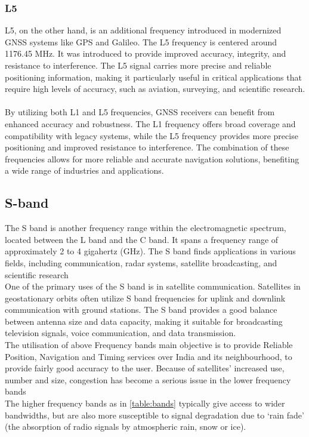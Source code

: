 \subsubsection{L5}
L5, on the other hand, is an additional frequency introduced in modernized GNSS systems like GPS and Galileo. The L5 frequency is centered around 1176.45 MHz. It was introduced to provide improved accuracy, integrity, and resistance to interference. The L5 signal carries more precise and reliable positioning information, making it particularly useful in critical applications that require high levels of accuracy, such as aviation, surveying, and scientific research.
\\
\\
By utilizing both L1 and L5 frequencies, GNSS receivers can benefit from enhanced accuracy and robustness. The L1 frequency offers broad coverage and compatibility with legacy systems, while the L5 frequency provides more precise positioning and improved resistance to interference. The combination of these frequencies allows for more reliable and accurate navigation solutions, benefiting a wide range of industries and applications.
\subsection{S-band} 
The S band is another frequency range within the electromagnetic spectrum, located between the L band and the C band. It spans a frequency range of approximately 2 to 4 gigahertz (GHz). The S band finds applications in various fields, including communication, radar systems, satellite broadcasting, and scientific research
\\
One of the primary uses of the S band is in satellite communication. Satellites in geostationary orbits often utilize S band frequencies for uplink and downlink communication with ground stations. The S band provides a good balance between antenna size and data capacity, making it suitable for broadcasting television signals, voice communication, and data transmission.
\\	
The utilisation of above Frequency bands main objective is to provide Reliable Position, Navigation and Timing services over India and its neighbourhood, to provide fairly good accuracy to the user. 
Because of satellites’ increased use, number and size, congestion has become a serious issue in the lower frequency bands
\\
The higher frequency bands as in \ref{table:bands} typically give access to wider bandwidths, but are also more susceptible to signal degradation due to ‘rain fade’ (the absorption of radio signals by atmospheric rain, snow or ice).

